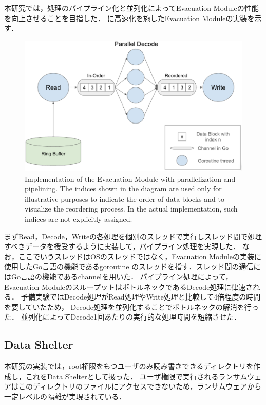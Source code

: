 本研究では，処理のパイプライン化と並列化によってEvacuation Moduleの性能を向上させることを目指した．
に高速化を施したEvacuation Moduleの実装を示す．
\begin{figure}[t]
  \begin{center}
    \includegraphics[width=\columnwidth]{doc/img/evac_mon_impl.eps}
  \end{center}
  \caption{Implementation of the Evacuation Module with parallelization and pipelining.
    The indices shown in the diagram are used only for illustrative purposes to indicate
    the order of data blocks and to visualize the reordering process. In the actual implementation,
    such indices are not explicitly assigned.
  }
  \label{fig:evac-mon-impl}
\end{figure}
まずRead，Decode，Writeの各処理を個別のスレッドで実行しスレッド間で処理すべきデータを授受するように実装して，パイプライン処理を実現した．
なお，ここでいうスレッドはOSのスレッドではなく，Evacuation Moduleの実装に使用したGo言語の機能であるgoroutine \cite{TheGoMem67:online}
のスレッドを指す．スレッド間の通信にはGo言語の機能であるchannelを用いた．
パイプライン処理によって，Evacuation ModuleのスループットはボトルネックであるDecode処理に律速される．
予備実験ではDecode処理がRead処理やWrite処理と比較して4倍程度の時間を要していたため，
Decode処理を並列化することでボトルネックの解消を行った．
並列化によってDecode1回あたりの実行的な処理時間を短縮させた．







\subsection{Data Shelter}
本研究の実装では，root権限をもつユーザのみ読み書きできるディレクトリを作成し，これをData Shelterとして扱った．
ユーザ権限で実行されるランサムウェアはこのディレクトリのファイルにアクセスできないため，ランサムウェアから一定レベルの隔離が実現されている．
